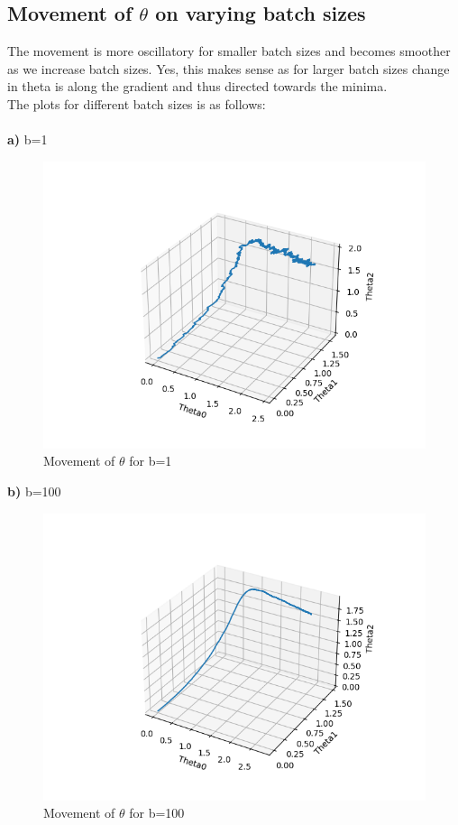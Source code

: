 \documentclass[12pt]{article}
\begin{document}
\subsection{Movement of $\theta$ on varying batch sizes}
The movement is more oscillatory for smaller batch sizes and becomes smoother as we increase batch sizes. Yes, this makes sense as for larger batch sizes change in theta is along the gradient and thus directed towards the minima.\\
The plots for different batch sizes is as follows:\\\\
\textbf{a)} b=1
\begin{figure}[H]
\centering
  \includegraphics[scale=0.78]{contourPlot1.png}
  \caption{Movement of $\theta$ for b=1}
  \label{fig3A}
\end{figure}
\textbf{b)} b=100
\begin{figure}[H]
\centering
  \includegraphics[scale=0.78]{contourPlot2.png}
  \caption{Movement of $\theta$ for b=100}
  \label{fig3A}
\end{figure}
\end{document}
